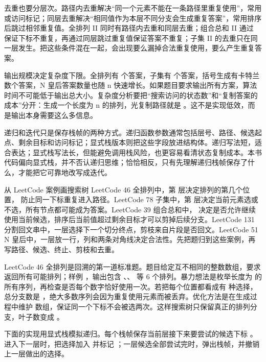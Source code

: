 去重也要分层次。路径内去重解决“同一个元素不能在一条路径里重复使用”，常用  或访问标记；同层去重解决“相同值作为本层不同分支会生成重复答案”，常用排序后跳过相邻重复值。全排列 II 同时有路径内去重和同层去重；组合总和 II 通过  保证下标不重复，再通过同层跳过重复值保证答案不重复；子集 II 的去重只在同一层发生。把这些条件混在一起，会出现要么漏掉合法重复使用，要么产生重复答案。

输出规模决定复杂度下限。全排列有  个答案，子集有  个答案，括号生成有卡特兰数个答案，N 皇后答案数量也随 n 快速增长。如果题目要求输出所有方案，算法时间不可能低于输出总大小。复杂度分析要把“搜索访问的状态数”和“复制答案的成本”分开：生成一个长度为 n 的排列，光复制路径就是 。这不是实现低效，而是输出本身需要这么多信息。

递归和迭代只是保存栈帧的两种方式。递归函数参数通常包括层号、路径、候选起点、剩余目标和访问标记；显式栈版本则把这些字段放进结构体。递归写法短，适合表达；显式栈写法长，但能避免调用栈风险，也更容易看清状态复制成本。本书代码偏向显式栈，并不否认递归思维；恰恰相反，只有先理解递归栈帧保存了什么，才能把它可靠地改写成迭代。

\begin{principlebox}{从 LeetCode 案例画搜索树}
LeetCode 46 全排列中，第  层决定排列的第几个位置， 防止同一下标重复进入路径。LeetCode 78 子集中，第  层决定当前元素选或不选，所有节点都可能成为答案。LeetCode 39 组合总和中， 决定是否允许继续使用当前候选，排序后当前值超过剩余目标才可以剪掉后续分支。LeetCode 131 分割回文串中，一层选择下一个切分终点，剪枝来自片段是否回文。LeetCode 51 N 皇后中，一层放一行，列和两条对角线决定合法性。先把题归到这些案例，再写路径、候选、终止、剪枝和去重。
\end{principlebox}

LeetCode 46 全排列是回溯的第一道标准题。题目给定互不相同的整数数组，要求返回所有可能排列；样例 ，输出包含 \code{[1,2,3]}、\code{[1,3,2]}、\code{[2,1,3]} 等 6 个排列。暴力想法是枚举长度为  的所有序列，再检查是否每个数字恰好使用一次。若把每个位置都看成有  种选择，总分支数是 ，绝大多数序列会因为重复使用元素而被丢弃。优化方法是在生成过程中维护  数组，保证同一个下标不会被选两次。这样搜索树只保留真正的排列分支，叶子数变成 。

下面的实现用显式栈模拟递归。每个栈帧保存当前层接下来要尝试的候选下标 。进入下一层时，把选择加入  并标记 ；一层候选全部尝试完时，弹出栈帧，并撤销上一层做出的选择。


